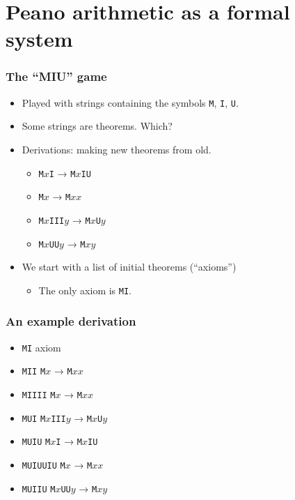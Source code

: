 \documentclass[mathserif]{beamer}
\begin{document}
\section{Peano arithmetic as a formal system}
\label{sec-2}
\begin{frame}
\frametitle{The ``MIU'' game}
\label{sec-2-1}
\begin{itemize}

\item Played with strings containing the symbols \texttt{M}, \texttt{I}, \texttt{U}.\\
\label{sec-2-1-1}%
\item Some strings are theorems. Which?\\
\label{sec-2-1-2}%
\item Derivations: making new theorems from old.
\label{sec-2-1-3}%
\begin{itemize}

\item \texttt{M$x$I} → \texttt{M$x$IU}\\
\label{sec-2-1-3-1}%
\item \texttt{M$x$} → \texttt{M$xx$}\\
\label{sec-2-1-3-2}%
\item \texttt{M$x$III$y$} → \texttt{M$x$U$y$}\\
\label{sec-2-1-3-3}%
\item \texttt{M$x$UU$y$} → \texttt{M$xy$}\\
\label{sec-2-1-3-4}%
\end{itemize} %

\item We start with a list of initial theorems (``axioms'')
\label{sec-2-1-4}%
\begin{itemize}

\item The only axiom is \texttt{MI}.\\
\label{sec-2-1-4-1}%
\end{itemize} %
\end{itemize} %
\end{frame}
\begin{frame}
\frametitle{An example derivation}
\label{sec-2-2}

\begin{itemize}
\item \texttt{MI} \hfill axiom
\item \texttt{MII} \hfill \texttt{M$x$} → \texttt{M$xx$}
\item \texttt{MIIII} \hfill \texttt{M$x$} → \texttt{M$xx$}
\item \texttt{MUI} \hfill \texttt{M$x$III$y$} → \texttt{M$x$U$y$}
\item \texttt{MUIU} \hfill \texttt{M$x$I} → \texttt{M$x$IU}
\item \texttt{MUIUUIU} \hfill \texttt{M$x$} → \texttt{M$xx$}
\item \texttt{MUIIU} \hfill \texttt{M$x$UU$y$} → \texttt{M$xy$}
\end{itemize}
\end{frame}
\end{document}
